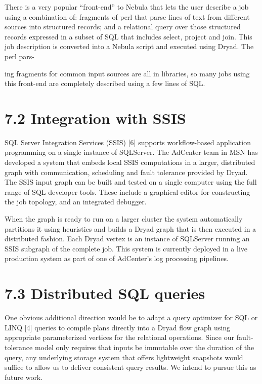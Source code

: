 \documentclass[
]{article}
\begin{document}
There is a very popular ``front-end'' to Nebula that lets the user
describe a job using a combination of: fragments of perl that parse
lines of text from different sources into structured records; and a
relational query over those structured records expressed in a subset of
SQL that includes select, project and join. This job description is
converted into a Nebula script and executed using Dryad. The perl pars-

ing fragments for common input sources are all in libraries, so many
jobs using this front-end are completely described using a few lines of
SQL.

\section{7.2 Integration with SSIS}\label{integration-with-ssis}

SQL Server Integration Services (SSIS) {[}6{]} supports workflow-based
application programming on a single instance of SQLServer. The AdCenter
team in MSN has developed a system that embeds local SSIS computations
in a larger, distributed graph with communication, scheduling and fault
tolerance provided by Dryad. The SSIS input graph can be built and
tested on a single computer using the full range of SQL developer tools.
These include a graphical editor for constructing the job topology, and
an integrated debugger.

When the graph is ready to run on a larger cluster the system
automatically partitions it using heuristics and builds a Dryad graph
that is then executed in a distributed fashion. Each Dryad vertex is an
instance of SQLServer running an SSIS subgraph of the complete job. This
system is currently deployed in a live production system as part of one
of AdCenter's log processing pipelines.

\section{7.3 Distributed SQL queries}\label{distributed-sql-queries}

One obvious additional direction would be to adapt a query optimizer for
SQL or LINQ {[}4{]} queries to compile plans directly into a Dryad flow
graph using appropriate parameterized vertices for the relational
operations. Since our fault-tolerance model only requires that inputs be
immutable over the duration of the query, any underlying storage system
that offers lightweight snapshots would suffice to allow us to deliver
consistent query results. We intend to pursue this as future work.
\end{document}
